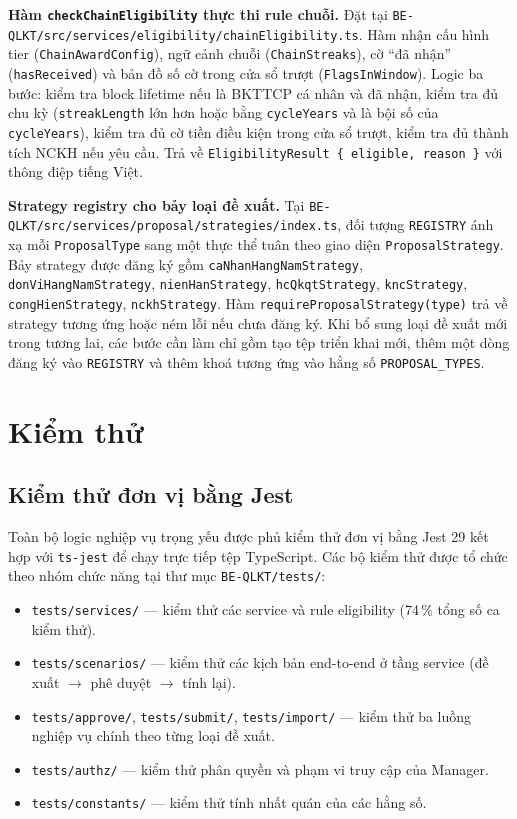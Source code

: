 \documentclass[../DoAn.tex]{subfiles}
\begin{document}
\textbf{Hàm \texttt{checkChainEligibility} thực thi rule chuỗi.} Đặt tại \texttt{BE-QLKT/src/services/eligibility/chainEligibility.ts}. Hàm nhận cấu hình tier (\texttt{ChainAwardConfig}), ngữ cảnh chuỗi (\texttt{ChainStreaks}), cờ ``đã nhận'' (\texttt{hasReceived}) và bản đồ số cờ trong cửa sổ trượt (\texttt{FlagsInWindow}). Logic ba bước: kiểm tra block lifetime nếu là BKTTCP cá nhân và đã nhận, kiểm tra đủ chu kỳ (\texttt{streakLength} lớn hơn hoặc bằng \texttt{cycleYears} và là bội số của \texttt{cycleYears}), kiểm tra đủ cờ tiền điều kiện trong cửa sổ trượt, kiểm tra đủ thành tích NCKH nếu yêu cầu. Trả về \texttt{EligibilityResult \{ eligible, reason \}} với thông điệp tiếng Việt.

\textbf{Strategy registry cho bảy loại đề xuất.} Tại \texttt{BE-QLKT/src/services/proposal/strategies/index.ts}, đối tượng \texttt{REGISTRY} ánh xạ mỗi \texttt{ProposalType} sang một thực thể tuân theo giao diện \texttt{ProposalStrategy}. Bảy strategy được đăng ký gồm \texttt{caNhanHangNamStrategy}, \texttt{donViHangNamStrategy}, \texttt{nienHanStrategy}, \texttt{hcQkqtStrategy}, \texttt{kncStrategy}, \texttt{congHienStrategy}, \texttt{nckhStrategy}. Hàm \texttt{requireProposalStrategy(type)} trả về strategy tương ứng hoặc ném lỗi nếu chưa đăng ký. Khi bổ sung loại đề xuất mới trong tương lai, các bước cần làm chỉ gồm tạo tệp triển khai mới, thêm một dòng đăng ký vào \texttt{REGISTRY} và thêm khoá tương ứng vào hằng số \texttt{PROPOSAL\_TYPES}.

\section{Kiểm thử}
\label{section:4.4}

\subsection{Kiểm thử đơn vị bằng Jest}
\label{subsection:4.4.1}

Toàn bộ logic nghiệp vụ trọng yếu được phủ kiểm thử đơn vị bằng Jest 29 kết hợp với \texttt{ts-jest} để chạy trực tiếp tệp TypeScript. Các bộ kiểm thử được tổ chức theo nhóm chức năng tại thư mục \texttt{BE-QLKT/tests/}:

\begin{itemize}
    \item \texttt{tests/services/} --- kiểm thử các service và rule eligibility (74\,\% tổng số ca kiểm thử).
    \item \texttt{tests/scenarios/} --- kiểm thử các kịch bản end-to-end ở tầng service (đề xuất $\rightarrow$ phê duyệt $\rightarrow$ tính lại).
    \item \texttt{tests/approve/}, \texttt{tests/submit/}, \texttt{tests/import/} --- kiểm thử ba luồng nghiệp vụ chính theo từng loại đề xuất.
    \item \texttt{tests/authz/} --- kiểm thử phân quyền và phạm vi truy cập của Manager.
    \item \texttt{tests/constants/} --- kiểm thử tính nhất quán của các hằng số.
\end{itemize}
\end{document}
